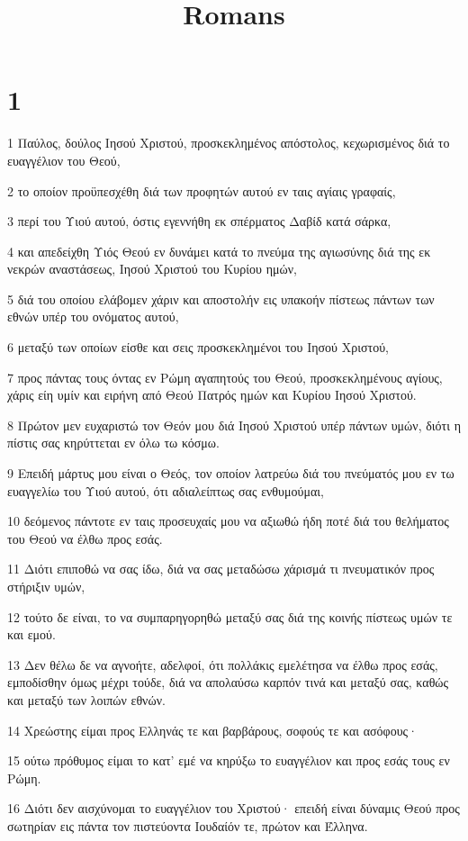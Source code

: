 

\title{Romans}


\chapter{1}

\par 1 Παύλος, δούλος Ιησού Χριστού, προσκεκλημένος απόστολος, κεχωρισμένος διά το ευαγγέλιον του Θεού,
\par 2 το οποίον προϋπεσχέθη διά των προφητών αυτού εν ταις αγίαις γραφαίς,
\par 3 περί του Υιού αυτού, όστις εγεννήθη εκ σπέρματος Δαβίδ κατά σάρκα,
\par 4 και απεδείχθη Υιός Θεού εν δυνάμει κατά το πνεύμα της αγιωσύνης διά της εκ νεκρών αναστάσεως, Ιησού Χριστού του Κυρίου ημών,
\par 5 διά του οποίου ελάβομεν χάριν και αποστολήν εις υπακοήν πίστεως πάντων των εθνών υπέρ του ονόματος αυτού,
\par 6 μεταξύ των οποίων είσθε και σεις προσκεκλημένοι του Ιησού Χριστού,
\par 7 προς πάντας τους όντας εν Ρώμη αγαπητούς του Θεού, προσκεκλημένους αγίους, χάρις είη υμίν και ειρήνη από Θεού Πατρός ημών και Κυρίου Ιησού Χριστού.
\par 8 Πρώτον μεν ευχαριστώ τον Θεόν μου διά Ιησού Χριστού υπέρ πάντων υμών, διότι η πίστις σας κηρύττεται εν όλω τω κόσμω.
\par 9 Επειδή μάρτυς μου είναι ο Θεός, τον οποίον λατρεύω διά του πνεύματός μου εν τω ευαγγελίω του Υιού αυτού, ότι αδιαλείπτως σας ενθυμούμαι,
\par 10 δεόμενος πάντοτε εν ταις προσευχαίς μου να αξιωθώ ήδη ποτέ διά του θελήματος του Θεού να έλθω προς εσάς.
\par 11 Διότι επιποθώ να σας ίδω, διά να σας μεταδώσω χάρισμά τι πνευματικόν προς στήριξιν υμών,
\par 12 τούτο δε είναι, το να συμπαρηγορηθώ μεταξύ σας διά της κοινής πίστεως υμών τε και εμού.
\par 13 Δεν θέλω δε να αγνοήτε, αδελφοί, ότι πολλάκις εμελέτησα να έλθω προς εσάς, εμποδίσθην όμως μέχρι τούδε, διά να απολαύσω καρπόν τινά και μεταξύ σας, καθώς και μεταξύ των λοιπών εθνών.
\par 14 Χρεώστης είμαι προς Ελληνάς τε και βαρβάρους, σοφούς τε και ασόφους·
\par 15 ούτω πρόθυμος είμαι το κατ' εμέ να κηρύξω το ευαγγέλιον και προς εσάς τους εν Ρώμη.
\par 16 Διότι δεν αισχύνομαι το ευαγγέλιον του Χριστού· επειδή είναι δύναμις Θεού προς σωτηρίαν εις πάντα τον πιστεύοντα Ιουδαίόν τε, πρώτον και Έλληνα.
